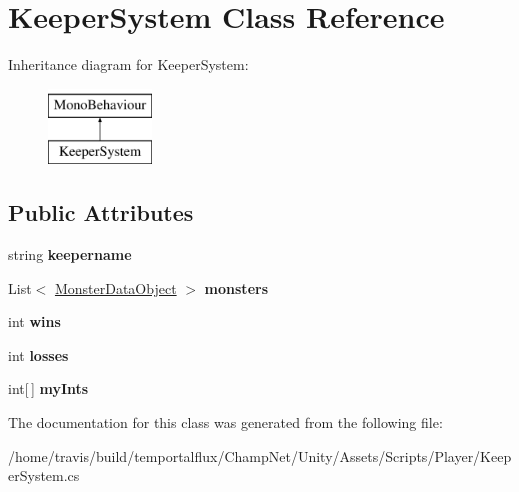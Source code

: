 \hypertarget{class_keeper_system}{\section{Keeper\-System Class Reference}
\label{class_keeper_system}
}
Inheritance diagram for Keeper\-System\-:\begin{figure}[H]
\begin{center}
\leavevmode
\includegraphics[height=2.000000cm]{class_keeper_system}
\end{center}
\end{figure}
\subsection*{Public Attributes}
\begin{DoxyCompactItemize}
\item 
\hypertarget{class_keeper_system_a351a9a8819200deb7e235c6ef2e059a6}{string {\bfseries keepername}}\label{class_keeper_system_a351a9a8819200deb7e235c6ef2e059a6}

\item 
\hypertarget{class_keeper_system_a10dc4e4959293cc3a39eda19d35e5c8c}{List$<$ \hyperlink{class_monster_data_object}{Monster\-Data\-Object} $>$ {\bfseries monsters}}\label{class_keeper_system_a10dc4e4959293cc3a39eda19d35e5c8c}

\item 
\hypertarget{class_keeper_system_a032c60966af729c76e4a09e1fa6dbadb}{int {\bfseries wins}}\label{class_keeper_system_a032c60966af729c76e4a09e1fa6dbadb}

\item 
\hypertarget{class_keeper_system_ab64ebb44295e23d56fc640ff92dfe5d2}{int {\bfseries losses}}\label{class_keeper_system_ab64ebb44295e23d56fc640ff92dfe5d2}

\item 
\hypertarget{class_keeper_system_acbb23e94bfc7bbc6bfeb8667fdd4aeca}{int\mbox{[}$\,$\mbox{]} {\bfseries my\-Ints}}\label{class_keeper_system_acbb23e94bfc7bbc6bfeb8667fdd4aeca}

\end{DoxyCompactItemize}


The documentation for this class was generated from the following file\-:\begin{DoxyCompactItemize}
\item 
/home/travis/build/temportalflux/\-Champ\-Net/\-Unity/\-Assets/\-Scripts/\-Player/Keeper\-System.\-cs\end{DoxyCompactItemize}

